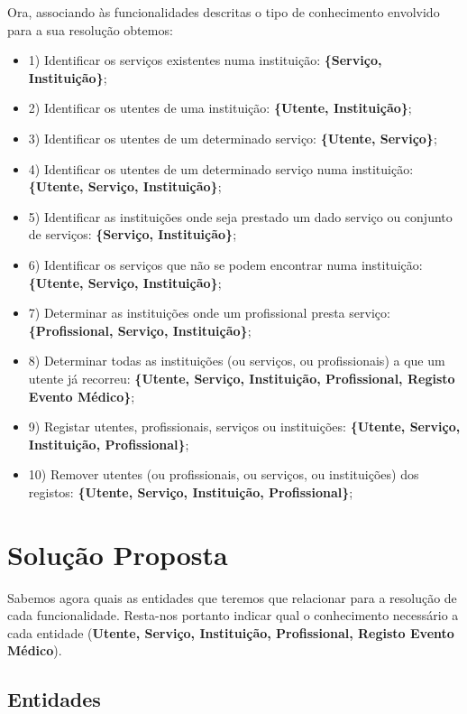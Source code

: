 \documentclass[
  oneside,
  10pt, a4paper,
  footinclude=true,
  headinclude=true,
  cleardoublepage=empty
]{scrbook}
\begin{document}
Ora, associando às funcionalidades descritas o tipo de conhecimento envolvido para a sua resolução obtemos:
\begin{itemize}
\item 1) Identificar os serviços existentes numa instituição: \textbf{\{Serviço, Instituição\}};
\item 2) Identificar os utentes de uma instituição: \textbf{\{Utente, Instituição\}};
\item 3) Identificar os utentes de um determinado serviço: \textbf{\{Utente, Serviço\}};
\item 4) Identificar os utentes de um determinado serviço numa instituição: \textbf{\{Utente, Serviço, Instituição\}};
\item 5) Identificar as instituições onde seja prestado um dado serviço ou conjunto de serviços: \textbf{\{Serviço, Instituição\}};
\item 6) Identificar os serviços que não se podem encontrar numa instituição: \textbf{\{Utente, Serviço, Instituição\}};
\item 7) Determinar as instituições onde um profissional presta serviço: \textbf{\{Profissional, Serviço, Instituição\}};
\item 8) Determinar todas as instituições (ou serviços, ou profissionais) a que um utente já recorreu: \textbf{\{Utente, Serviço, Instituição, Profissional, Registo Evento Médico\}};
\item 9) Registar utentes, profissionais, serviços ou instituições:  \textbf{\{Utente, Serviço, Instituição, Profissional\}};
\item 10) Remover utentes (ou profissionais, ou serviços, ou instituições) dos registos: \textbf{\{Utente, Serviço, Instituição, Profissional\}};
\end{itemize}

\chapter{Solução Proposta}

Sabemos agora quais as entidades que teremos que relacionar para a resolução de cada funcionalidade. Resta-nos portanto indicar qual o conhecimento necessário a cada entidade (\textbf{Utente, Serviço, Instituição, Profissional, Registo Evento Médico}).

    \section{Entidades}
\end{document}
